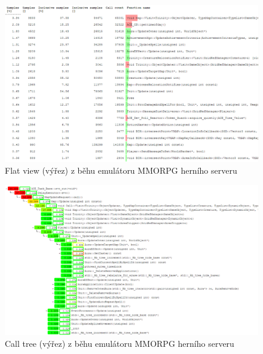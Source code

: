 \documentclass[czech,BP]{thesiskiv}
\begin{document}
\begin{figure}[h]
    \centering
    \includegraphics[interpolate,width=1.0\textwidth]{img/test-gcore-flat.png}
    \caption{Flat view (výřez) z běhu emulátoru MMORPG herního serveru}
    \label{obr:testprefflat-gcore}
\end{figure}

\begin{figure}[h]
    \centering
    \includegraphics[interpolate,width=1.0\textwidth]{img/test-gcore-calltree.png}
    \caption{Call tree (výřez) z běhu emulátoru MMORPG herního serveru}
    \label{obr:testpreftree-gcore}
\end{figure}
\end{document}
